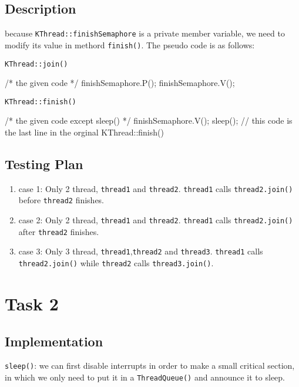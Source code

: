 \documentclass{article}
\begin{document}
\begin{spacing}{1.1}
    \subsection{Description}
    because \texttt{KThread::finishSemaphore} is a private
    member variable, we need to modify its value in methord \texttt{finish()}.
    The pseudo code is as follows:
    \begin{algorithm}
      \caption{\texttt{KThread::join()}}
      \begin{algorithmic}[1]
	\STATE /* the given code */
	\STATE finishSemaphore.P();
	\STATE finishSemaphore.V();
      \end{algorithmic}
    \end{algorithm}

    \begin{algorithm}
      \caption{\texttt{KThread::finish()}}
      \begin{algorithmic}[1]
	\STATE /* the given code except sleep() */
	\STATE finishSemaphore.V();
	\STATE sleep(); // this code is the last line in the orginal KThread::finish()
      \end{algorithmic}
    \end{algorithm}

    \subsection{Testing Plan}
    \begin{enumerate}
      \item[] case 1: Only 2 thread, \texttt{thread1} and \texttt{thread2}.
	\texttt{thread1} calls \texttt{thread2.join()} before \texttt{thread2} finishes.
      \item[] case 2: Only 2 thread, \texttt{thread1} and \texttt{thread2}.
	\texttt{thread1} calls \texttt{thread2.join()} after \texttt{thread2} finishes.
      \item[] case 3: Only 3 thread, \texttt{thread1},\texttt{thread2} and
	\texttt{thread3}. \texttt{thread1} calls \texttt{thread2.join()} while
	\texttt{thread2} calls \texttt{thread3.join()}.
    \end{enumerate}
    \section{Task 2}
    \subsection{Implementation}
    \texttt{sleep()}: we can first disable interrupts in order to make a small critical section, in which we only need to put it in a \texttt{ThreadQueue()} and announce it to sleep.


\end{spacing}
\end{document}
